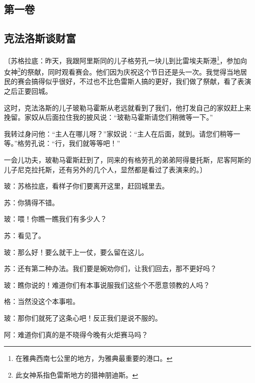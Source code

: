 \documentclass[11pt,oneside]{book}
\begin{document}
\frontmatter


\author{柏拉图}
\titleLA



\setcounter{tocdepth}{1}
\tableofcontents

\begin{common-format}
\mainmatter

\chapter{第一卷}
\section{克法洛斯谈财富}
〔苏格拉底：昨天，我跟阿里斯同的儿子格劳孔一块儿到比雷埃夫斯港\footnote{在雅典西南七公里的地方，为雅典最重要的港口。}，参加向女神\footnote{此女神系指色雷斯地方的猎神朋迪斯。}的祭献，同时观看赛会。他们因为庆祝这个节日还是头一次。我觉得当地居民的赛会搞得似乎很好，不过也不比色雷斯人搞的更好，我们做了祭献，看了表演之后正要回城。

这时，克法洛斯的儿子玻勒马霍斯从老远就看到了我们，他打发自己的家奴赶上来挽留。家奴从后面拉住我的披风说：“玻勒马霍斯请您们稍微等一下。”

我转过身问他：“主人在哪儿呀？”家奴说：“主人在后面，就到。请您们稍等一等。”格劳孔说：“行，我们就等等吧！”

一会儿功夫，玻勒马霍斯赶到了，同来的有格劳孔的弟弟阿得曼托斯，尼客阿斯的儿子尼克拉托斯，还有另外的几个人，显然都是看过了表演来的。〕

玻：苏格拉底，看样子你们要离开这里，赶回城里去。

苏：你猜得不错。

玻：喂！你瞧一瞧我们有多少人？

苏：看见了。

玻：那么好！要么就干上一仗，要么留在这儿。

苏：还有第二种办法。我们要是婉劝你们，让我们回去，那不更好吗？

玻：瞧你说的！难道你们有本事说服我们这些个不愿意领教的人吗？

格：当然没这个本事啦。

玻：那你们就死了这条心吧！反正我们是说不服的。

阿：难道你们真的是不晓得今晚有火炬赛马吗？


\end{common-format}
\end{document}
